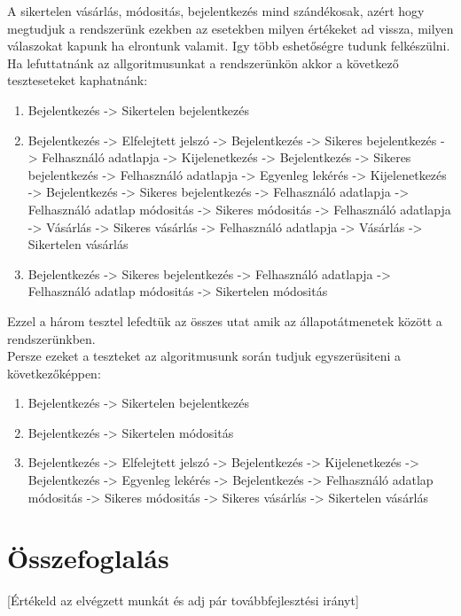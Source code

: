 \documentclass[12pt]{article}
\begin{document}
A sikertelen vásárlás, módositás, bejelentkezés mind szándékosak, azért hogy megtudjuk a rendszerünk ezekben az esetekben milyen értékeket ad vissza, milyen válaszokat kapunk ha elrontunk valamit. Igy több eshetőségre tudunk felkészülni.\\

Ha lefuttatnánk az allgoritmusunkat a rendszerünkön akkor a következő teszteseteket kaphatnánk:
\begin{enumerate}
\item Bejelentkezés -> Sikertelen bejelentkezés
\item Bejelentkezés -> Elfelejtett jelszó -> Bejelentkezés -> Sikeres bejelentkezés -> Felhasználó adatlapja -> Kijelenetkezés -> Bejelentkezés -> Sikeres bejelentkezés -> Felhasználó adatlapja -> Egyenleg lekérés -> Kijelenetkezés -> Bejelentkezés -> Sikeres bejelentkezés -> Felhasználó adatlapja -> Felhasználó adatlap módositás -> Sikeres módositás -> Felhasználó adatlapja -> Vásárlás -> Sikeres vásárlás -> Felhasználó adatlapja -> Vásárlás -> Sikertelen vásárlás
\item Bejelentkezés -> Sikeres bejelentkezés -> Felhasználó adatlapja -> Felhasználó adatlap módositás -> Sikertelen módositás
\end{enumerate}

Ezzel a három tesztel lefedtük az összes utat amik az állapotátmenetek között a rendszerünkben.\\

Persze ezeket a teszteket az algoritmusunk során tudjuk egyszerüsiteni a következőképpen:
\begin{enumerate}
\item Bejelentkezés -> Sikertelen bejelentkezés
\item Bejelentkezés -> Sikertelen módositás
\item Bejelentkezés -> Elfelejtett jelszó -> Bejelentkezés -> Kijelenetkezés -> Bejelentkezés -> Egyenleg lekérés -> Bejelentkezés -> Felhasználó adatlap módositás -> Sikeres módositás -> Sikeres vásárlás -> Sikertelen vásárlás
\end{enumerate}


\section{Összefoglalás}
[Értékeld az elvégzett munkát és adj pár továbbfejlesztési irányt]



\newpage


\end{document}
